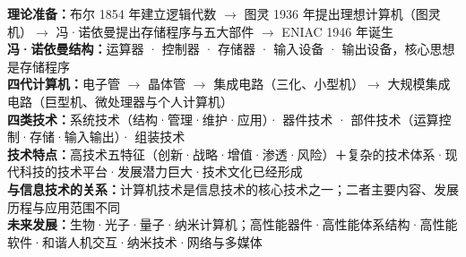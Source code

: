 \documentclass[a4paper,11pt]{article}
\begin{document}

\begin{knowmap}
\textbf{理论准备：}布尔 1854 年建立逻辑代数 $\rightarrow$ 图灵 1936 年提出理想计算机（图灵机）$\rightarrow$ 冯·诺依曼提出存储程序与五大部件 $\rightarrow$ ENIAC 1946 年诞生\\[2pt]
\textbf{冯·诺依曼结构：}运算器 · 控制器 · 存储器 · 输入设备 · 输出设备，核心思想是存储程序\\[2pt]
\textbf{四代计算机：}电子管 $\rightarrow$ 晶体管 $\rightarrow$ 集成电路（三化、小型机）$\rightarrow$ 大规模集成电路（巨型机、微处理器与个人计算机）\\[2pt]
\textbf{四类技术：}系统技术（结构·管理·维护·应用）· 器件技术 · 部件技术（运算控制·存储·输入输出）· 组装技术\\[2pt]
\textbf{技术特点：}高技术五特征（创新·战略·增值·渗透·风险）＋复杂的技术体系·现代科技的技术平台·发展潜力巨大·技术文化已经形成\\[2pt]
\textbf{与信息技术的关系：}计算机技术是信息技术的核心技术之一；二者主要内容、发展历程与应用范围不同\\[2pt]
\textbf{未来发展：}生物·光子·量子·纳米计算机；高性能器件·高性能体系结构·高性能软件·和谐人机交互·纳米技术·网络与多媒体
\end{knowmap}
\end{document}
